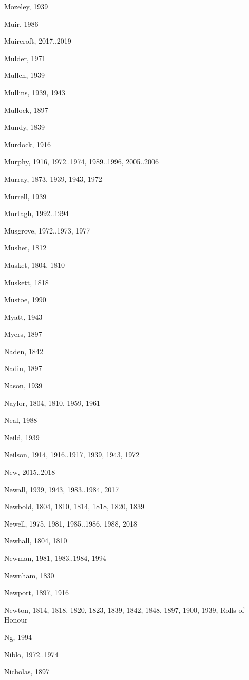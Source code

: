 \begin{theindex}
\item Mozeley, 1939
\item Muir, 1986
\item Muircroft, 2017..2019
\item Mulder, 1971
\item Mullen, 1939
\item Mullins, 1939, 1943
\item Mullock, 1897
\item Mundy, 1839
\item Murdock, 1916
\item Murphy, 1916, 1972..1974, 1989..1996, 2005..2006
\item Murray, 1873, 1939, 1943, 1972
\item Murrell, 1939
\item Murtagh, 1992..1994
\item Musgrove, 1972..1973, 1977
\item Mushet, 1812
\item Musket, 1804, 1810
\item Muskett, 1818
\item Mustoe, 1990
\item Myatt, 1943
\item Myers, 1897
\item Naden, 1842
\item Nadin, 1897
\item Nason, 1939
\item Naylor, 1804, 1810, 1959, 1961
\item Neal, 1988
\item Neild, 1939
\item Neilson, 1914, 1916..1917, 1939, 1943, 1972
\item New, 2015..2018
\item Newall, 1939, 1943, 1983..1984, 2017
\item Newbold, 1804, 1810, 1814, 1818, 1820, 1839
\item Newell, 1975, 1981, 1985..1986, 1988, 2018
\item Newhall, 1804, 1810
\item Newman, 1981, 1983..1984, 1994
\item Newnham, 1830
\item Newport, 1897, 1916
\item Newton, 1814, 1818, 1820, 1823, 1839, 1842, 1848, 1897, 1900, 1939, Rolls of Honour
\item Ng, 1994
\item Niblo, 1972..1974
\item Nicholas, 1897

\end{theindex}
